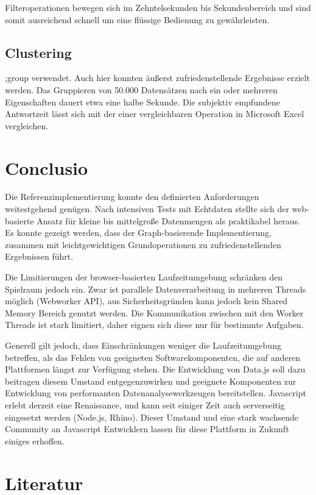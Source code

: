 \documentclass[runningheads]{llncs}
\begin{document}
Filteroperationen bewegen sich im Zehntelsekunden bis Sekundenbereich und sind somit ausreichend schnell um eine flüssige Bedienung zu gewährleisten.

\subsection{Clustering}
;group verwendet. Auch hier konnten äußerst zufriedenstellende Ergebnisse erzielt werden. Das Gruppieren von 50.000 Datensätzen nach ein oder mehreren Eigenschaften dauert etwa eine halbe Sekunde. Die subjektiv empfundene Antwortzeit lässt sich mit der einer vergleichbaren Operation in Microsoft Excel vergleichen.

\section{Conclusio}


Die Referenzimplementierung konnte den definierten Anforderungen weitestgehend genügen. Nach intensiven Tests mit Echtdaten stellte sich der web-basierte Ansatz für kleine bis mittelgroße Datenmengen als praktikabel heraus. Es konnte gezeigt werden, dass der Graph-basierende Implementierung, zusammen mit leichtgewichtigen Grundoperationen zu zufriedenstellenden Ergebnissen führt.

Die Limitierungen der browser-basierten Laufzeitumgebung schränken den Spielraum jedoch ein. Zwar ist parallele Datenverarbeitung in mehreren Threads möglich (Webworker API), aus Sicherheitsgründen kann jedoch kein Shared Memory Bereich genutzt werden. Die Kommunikation zwischen mit den Worker Threads ist stark limitiert, daher eignen sich diese nur für bestimmte Aufgaben.

Generell gilt jedoch, dass Einschränkungen weniger die Laufzeitumgebung betreffen, als das Fehlen von geeigneten Softwarekomponenten, die auf anderen Plattformen längst zur Verfügung stehen. Die Entwicklung von Data.js soll dazu beitragen diesem Umstand entgegenzuwirken und geeignete Komponenten zur Entwicklung von performanten Datenanalysewerkzeugen bereitstellen. Javascript erlebt derzeit eine Renaissance, und kann seit einiger Zeit auch serverseitig eingesetzt werden (Node.js, Rhino). Dieser Umstand und eine stark wachsende Community an Javascript Entwicklern lassen für diese Plattform in Zukunft einiges erhoffen. 

\section{Literatur}
\end{document}
